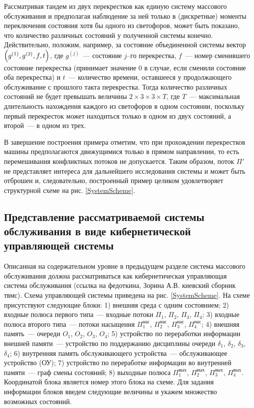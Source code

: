 \documentclass[a4paper,12pt,russian]{extarticle}
\begin{document}
Рассматривая тандем из двух перекрестков как единую систему массового обслуживания и предполагая наблюдение за ней только в (дискретные) моменты переключения состояния хотя бы одного из светофоров, может быть показано, что количество различных состояний у полученной системы конечно. Действительно, положим, например, за состояние объединенной системы вектор $\left(g^{(1)},g^{(2)}, f, t\right)$, где $g^{(j)}$~--- состояние $j$--го перекрестка, $f$~--- номер сменившего состояние перекрестка (принимает значение $0$ в случае, если сменили состояние оба перекрестка) и $t$~--- количество времени, оставшееся у продолжающего обслуживание с прошлого такта перекрестка. Тогда количество различных состояний не будет превышать величины  $2\times 3 \times 3 \times T$, где $T$~--- максимальная длительность нахождения каждого из светофоров в одном состоянии, поскольку первый перекресток может находиться только в одном из двух состояний, а второй~--- в одном из трех.

В завершение построения примера отметим, что при прохождении перекрестков машины предполагаются движущимися только в прямом направлении, то есть перемешивания конфликтных потоков не допускается. Таким образом, поток $\Pi'$ не представляет интереса для дальнейшего исследования системы и может быть отброшен и, следовательно, построенный пример целиком удовлетворяет структурной схеме на рис. \ref{SystemScheme}.
 
\subsection{Представление рассматриваемой системы обслуживания в виде кибернетической управляющей системы}
Описанная на содержательном уровне в предыдущем разделе система массового обслуживания должна рассматриваться как кибернетическая управляющая система обслуживания (ссылка на федоткина, Зорина А.В. киевский сборник твмс). Схема управляющей системы приведена на рис. \ref{SystemScheme}. На схеме присутствуют следующие блоки: 1) внешняя среда с одним состоянием; 2) входные полюса первого типа~--- входные потоки $\Pi_1$, $\Pi_2$, $\Pi_3$, $\Pi_4$; 3) входные полюса второго типа~--- потоки насыщения $\Pi_1^{\mathrm{нас}}$, $\Pi_2^{\mathrm{нас}}$, $\Pi_3^{\mathrm{нас}}$, $\Pi_4^{\mathrm{нас}}$; 4) внешняя память~--- очереди $O_1$, $O_2$, $O_3$, $O_4$; 5) устройство по переработки информации внешней памяти~--- устройство по поддержанию дисциплины очереди $\delta_1$, $\delta_2$, $\delta_3$, $\delta_4$; 6) внутренняя память обслуживающего устройства~--- обслуживающее устройство (ОУ); 7) устройство по переработке информации во внутренней памяти~--- граф смены состояний; 8) выходные полюса $\Pi_1^{\mathrm{вых}}$, $\Pi_2^{\mathrm{вых}}$, $\Pi_3^{\mathrm{вых}}$, $\Pi_4^{\mathrm{вых}}$. Координатой блока является номер этого блока на схеме. Для задания информации блоков введем следующие величины и укажем множество возможных состояний.
\end{document}
